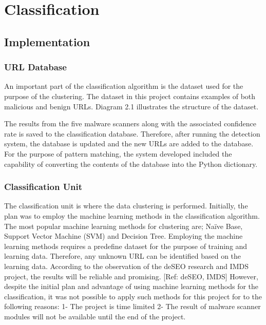 \section{Classification}

\subsection{Implementation}

\subsubsection{URL Database}

An important part of the classification algorithm is the dataset used for the purpose of the clustering. The dataset in this project contains examples of both malicious and benign URLs. Diagram 2.1 illustrates the structure of the dataset.  


The results from the five malware scanners along with the associated confidence rate is saved to the classification database. Therefore, after running the detection system, the database is updated and the new URLs are added to the database. For the purpose of pattern matching, the system developed included the capability of converting the contents of the database into the Python dictionary.

\subsubsection{Classification Unit}
 
The classification unit is where the data clustering is performed. Initially, the plan was to employ the machine learning methods in the classification algorithm. The most popular machine learning methods for clustering are; Naïve Base, Support Vector Machine (SVM) and Decision Tree. Employing the machine learning methods requires a predefine dataset for the purpose of training and learning data. Therefore, any unknown URL can be identified based on the learning data. According to the observation of the deSEO research and IMDS project, the results will be reliable and promising. [Ref: deSEO, IMDS]
However, despite the initial plan and advantage of using machine learning methods for the classification, it was not possible to apply such methods for this project for to the following reasons:
1-	The project is time limited  
2-	The result of malware scanner modules will not be available until the end of the project.

